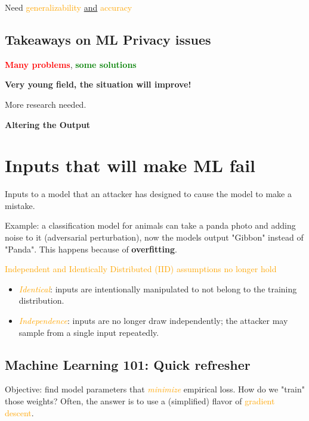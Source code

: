 \documentclass[11pt]{article}
\begin{document}
Need \textcolor{orange}{generalizability} \underline{and} \textcolor{orange}{accuracy}

\subsection*{Takeaways on ML Privacy issues}

\textbf{\textcolor{red}{Many problems}}, \textbf{\textcolor{green}{some solutions}}

\textbf{Very young field, the situation will improve!}

More research needed. 

\vspace{0.5cm}

\begin{center}
  {\LARGE \textbf{Altering the Output}}
\end{center}
\vspace{0.5cm}

\section*{Inputs that will make ML fail}

Inputs to a model that an attacker has designed to cause the model to make a mistake.

Example: a classification model for animals can take a panda photo and adding noise to it (adversarial perturbation), now the models output "Gibbon" instead of "Panda". This happens because of \textbf{overfitting}.

\textcolor{orange}{Independent and Identically Distributed (IID) assumptions no longer hold}

\begin{itemize}
	\item \textit{\textcolor{orange}{Identical}}: inputs are intentionally manipulated to not belong to the training distribution.
	\item \textit{\textcolor{orange}{Independence}}: inputs are no longer draw independently; the attacker may sample from a single input repeatedly. 
\end{itemize}

\subsection*{Machine Learning 101: Quick refresher}

Objective: find model parameters that \textit{\textcolor{orange}{minimize}} empirical loss. How do we "train" those weights? Often, the answer is to use a (simplified) flavor of \textcolor{orange}{gradient descent}.
\end{document}
